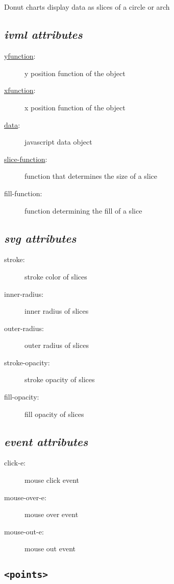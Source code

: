 \subsection*{{\tt <donut-charts>}}
\hrulefill\newline
 Donut charts display data as slices of a circle or arch
\subsection*{\emph{ivml attributes}}
\begin{description}
\item[\uline{yfunction}:]{y position function of the object}
\item[\uline{xfunction}:]{x position function of the object}
\item[\uline{data}:]{javascript data object}
\item[\uline{slice-function}:]{function that determines the size of a slice}
\item[fill-function:]{function determining the fill of a slice}
\end{description}
\subsection*{\emph{svg attributes}}
\begin{description}
\item[stroke:]{stroke color of slices}
\item[inner-radius:]{inner radius of slices}
\item[outer-radius:]{outer radius of slices}
\item[stroke-opacity:]{stroke opacity of slices}
\item[fill-opacity:]{fill opacity of slices}
\end{description}
\subsection*{\emph{event attributes}}
\begin{description}
\item[click-e:]{mouse click event}
\item[mouse-over-e:]{mouse over event}
\item[mouse-out-e:]{mouse out event}
\end{description}
\clearpage \noindent \hrulefill
\subsection*{{\tt <points>}}
\hrulefill\newline


